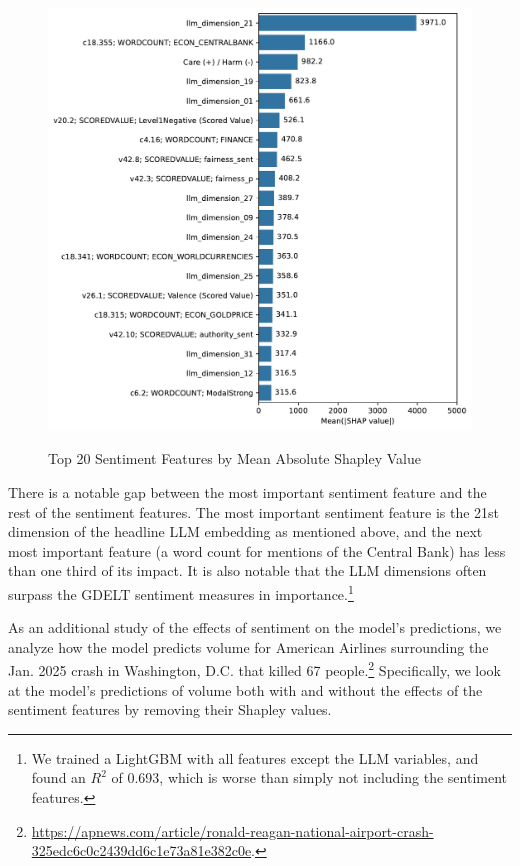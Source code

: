 \documentclass[12pt]{article}
\begin{document}
\begin{figure}[H]
    \centering
    \caption{Top 20 Sentiment Features by Mean Absolute Shapley Value}
    \includegraphics[width=0.75\linewidth]{../Output/shap_abs_sentiment_top20.pdf}
    \label{fig:shapley_sentiment_top20}
\end{figure}

There is a notable gap between the most important sentiment feature and the rest of the sentiment features. The most important sentiment feature is the 21st dimension of the headline LLM embedding as mentioned above, and the next most important feature (a word count for mentions of the Central Bank) has less than one third of its impact. It is also notable that the LLM dimensions often surpass the GDELT sentiment measures in importance.\footnote{We trained a LightGBM with all features except the LLM variables, and found an $R^2$ of 0.693, which is worse than simply not including the sentiment features.} 

As an additional study of the effects of sentiment on the model's predictions, we analyze how the model predicts volume for American Airlines surrounding the Jan. 2025 crash in Washington, D.C. that killed 67 people.\footnote{\url{https://apnews.com/article/ronald-reagan-national-airport-crash-325edc6c0c2439dd6c1e73a81e382c0e}.} Specifically, we look at the model's predictions of volume both with and without the effects of the sentiment features by removing their Shapley values.
\end{document}

